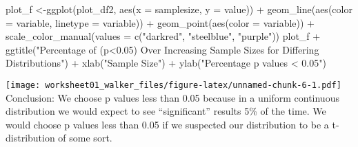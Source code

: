 \documentclass[
]{article}
\newenvironment{Shaded}{\begin{snugshade}}{\end{snugshade}}
\newcommand{\AttributeTok}[1]{\textcolor[rgb]{0.77,0.63,0.00}{#1}}
\newcommand{\FunctionTok}[1]{\textcolor[rgb]{0.00,0.00,0.00}{#1}}
\newcommand{\NormalTok}[1]{#1}
\newcommand{\OtherTok}[1]{\textcolor[rgb]{0.56,0.35,0.01}{#1}}
\newcommand{\SpecialCharTok}[1]{\textcolor[rgb]{0.00,0.00,0.00}{#1}}
\newcommand{\StringTok}[1]{\textcolor[rgb]{0.31,0.60,0.02}{#1}}
\begin{document}
\begin{Shaded}
\begin{Highlighting}[]
\NormalTok{plot\_f }\OtherTok{\textless{}{-}}\FunctionTok{ggplot}\NormalTok{(plot\_df2, }\FunctionTok{aes}\NormalTok{(}\AttributeTok{x =}\NormalTok{ samplesize, }\AttributeTok{y =}\NormalTok{ value)) }\SpecialCharTok{+} 
  \FunctionTok{geom\_line}\NormalTok{(}\FunctionTok{aes}\NormalTok{(}\AttributeTok{color =}\NormalTok{ variable, }\AttributeTok{linetype =}\NormalTok{ variable)) }\SpecialCharTok{+} 
  \FunctionTok{geom\_point}\NormalTok{(}\FunctionTok{aes}\NormalTok{(}\AttributeTok{color =}\NormalTok{ variable)) }\SpecialCharTok{+}
  \FunctionTok{scale\_color\_manual}\NormalTok{(}\AttributeTok{values =} \FunctionTok{c}\NormalTok{(}\StringTok{"darkred"}\NormalTok{, }\StringTok{"steelblue"}\NormalTok{, }\StringTok{"purple"}\NormalTok{))}
\NormalTok{plot\_f }\SpecialCharTok{+} \FunctionTok{ggtitle}\NormalTok{(}\StringTok{"Percentage of (p\textless{}0.05) Over Increasing Sample Sizes for Differing Distributions"}\NormalTok{) }\SpecialCharTok{+} \FunctionTok{xlab}\NormalTok{(}\StringTok{"Sample Size"}\NormalTok{) }\SpecialCharTok{+} \FunctionTok{ylab}\NormalTok{(}\StringTok{"Percentage p values \textless{} 0.05"}\NormalTok{)}
\end{Highlighting}
\end{Shaded}

\texttt{[image: worksheet01\_walker\_files/figure-latex/unnamed-chunk-6-1.pdf]}
Conclusion: We choose p values less than 0.05 because in a uniform
continuous distribution we would expect to see ``significant'' results
5\% of the time. We would choose p values less than 0.05 if we suspected
our distribution to be a t-distribution of some sort.
\end{document}

